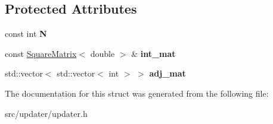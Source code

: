 \subsection*{Protected Attributes}
\begin{DoxyCompactItemize}
\item 
\mbox{\label{structopenjij_1_1updater_1_1_updater_abc0bc39509a6787c46cce948c3751f55}} 
const int {\bfseries N}
\item 
\mbox{\label{structopenjij_1_1updater_1_1_updater_a6edd50dda95164725c17debf9f6aed01}} 
const \mbox{\hyperlink{structopenjij_1_1_square_matrix}{Square\+Matrix}}$<$ double $>$ \& {\bfseries int\+\_\+mat}
\item 
\mbox{\label{structopenjij_1_1updater_1_1_updater_a03efaec3843b7209742b81f7987e8324}} 
std\+::vector$<$ std\+::vector$<$ int $>$ $>$ {\bfseries adj\+\_\+mat}
\end{DoxyCompactItemize}


The documentation for this struct was generated from the following file\+:\begin{DoxyCompactItemize}
\item 
src/updater/updater.\+h\end{DoxyCompactItemize}
